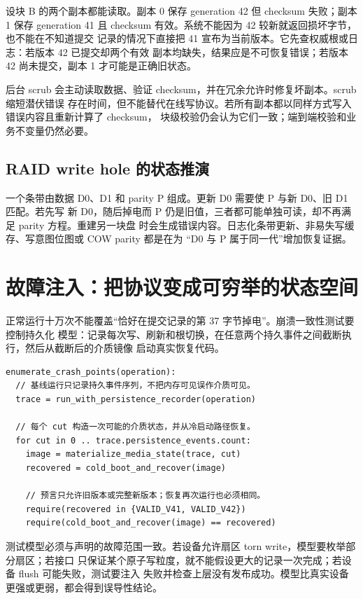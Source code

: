 设块 B 的两个副本都能读取。副本 0 保存 generation 42 但 checksum 失败；副本 1 保存
generation 41 且 checksum 有效。系统不能因为 42 较新就返回损坏字节，也不能在不知道提交
记录的情况下直接把 41 宣布为当前版本。它先查权威根或日志：若版本 42 已提交却两个有效
副本均缺失，结果应是不可恢复错误；若版本 42 尚未提交，副本 1 才可能是正确旧状态。

后台 scrub 会主动读取数据、验证 checksum，并在冗余允许时修复坏副本。scrub 缩短潜伏错误
存在时间，但不能替代在线写协议。若所有副本都以同样方式写入错误内容且重新计算了 checksum，
块级校验仍会认为它们一致；端到端校验和业务不变量仍然必要。

\subsection{RAID write hole 的状态推演}

一个条带由数据 D0、D1 和 parity P 组成。更新 D0 需要使 P 与新 D0、旧 D1 匹配。若先写
新 D0，随后掉电而 P 仍是旧值，三者都可能单独可读，却不再满足 parity 方程。重建另一块盘
时会生成错误内容。日志化条带更新、非易失写缓存、写意图位图或 COW parity 都是在为
“D0 与 P 属于同一代”增加恢复证据。

\section{故障注入：把协议变成可穷举的状态空间}

正常运行十万次不能覆盖“恰好在提交记录的第 37 字节掉电”。崩溃一致性测试要控制持久化
模型：记录每次写、刷新和根切换，在任意两个持久事件之间截断执行，然后从截断后的介质镜像
启动真实恢复代码。

\begin{lstlisting}
enumerate_crash_points(operation):
  // 基线运行只记录持久事件序列，不把内存可见误作介质可见。
  trace = run_with_persistence_recorder(operation)

  // 每个 cut 构造一次可能的介质状态，并从冷启动路径恢复。
  for cut in 0 .. trace.persistence_events.count:
    image = materialize_media_state(trace, cut)
    recovered = cold_boot_and_recover(image)

    // 预言只允许旧版本或完整新版本；恢复再次运行也必须相同。
    require(recovered in {VALID_V41, VALID_V42})
    require(cold_boot_and_recover(image) == recovered)
\end{lstlisting}

测试模型必须与声明的故障范围一致。若设备允许扇区 torn write，模型要枚举部分扇区；若接口
只保证某个原子写粒度，就不能假设更大的记录一次完成；若设备 flush 可能失败，测试要注入
失败并检查上层没有发布成功。模型比真实设备更强或更弱，都会得到误导性结论。

